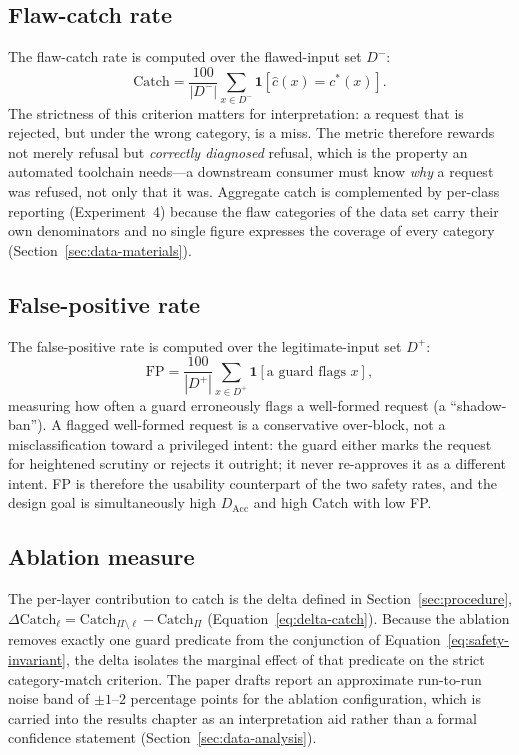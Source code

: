 \subsection*{Flaw-catch rate}

The flaw-catch rate is computed over the flawed-input set $D^-$:
\begin{equation}
\mathrm{Catch}=\frac{100}{|D^-|}\sum_{x\in D^-}
\mathbf{1}\!\left[\hat{c}(x)=c^\ast(x)\right].
\label{eq:metric-catch}
\end{equation}
The strictness of this criterion matters for interpretation: a request that is
rejected, but under the wrong category, is a miss. The metric therefore rewards
not merely refusal but \emph{correctly diagnosed} refusal, which is the property
an automated toolchain needs---a downstream consumer must know \emph{why} a
request was refused, not only that it was. Aggregate catch is complemented by
per-class reporting (Experiment~4) because the flaw categories of the data set
carry their own denominators and no single figure expresses the coverage of
every category (Section~\ref{sec:data-materials}).

\subsection*{False-positive rate}

The false-positive rate is computed over the legitimate-input set $D^+$:
\begin{equation}
\mathrm{FP}=\frac{100}{|D^+|}\sum_{x\in D^+}
\mathbf{1}\!\left[\text{a guard flags }x\right],
\label{eq:metric-fp}
\end{equation}
measuring how often a guard erroneously flags a well-formed request (a
``shadow-ban''). A flagged well-formed request is a conservative over-block, not
a misclassification toward a privileged intent: the guard either marks the
request for heightened scrutiny or rejects it outright; it never re-approves it
as a different intent. FP is therefore the usability counterpart of the two
safety rates, and the design goal is simultaneously high $D_{\mathrm{Acc}}$ and
high Catch with low FP.

\subsection*{Ablation measure}

The per-layer contribution to catch is the delta defined in
Section~\ref{sec:procedure},
$\Delta\mathrm{Catch}_{\ell}=\mathrm{Catch}_{\Pi\setminus\ell}
-\mathrm{Catch}_{\Pi}$ (Equation~\ref{eq:delta-catch}). Because the ablation
removes exactly one guard predicate from the conjunction of
Equation~\ref{eq:safety-invariant}, the delta isolates the marginal effect of
that predicate on the strict category-match criterion. The paper drafts report
an approximate run-to-run noise band of $\pm1$--$2$ percentage points for the
ablation configuration, which is carried into the results chapter as an
interpretation aid rather than a formal confidence statement
(Section~\ref{sec:data-analysis}).

